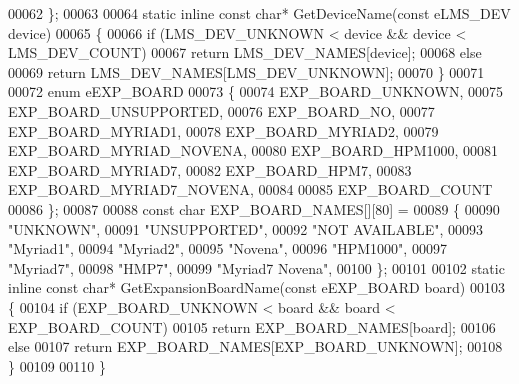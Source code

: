 \begin{DoxyCode}
00062 \};
00063 
00064 \textcolor{keyword}{static} \textcolor{keyword}{inline} \textcolor{keyword}{const} \textcolor{keywordtype}{char}* GetDeviceName(\textcolor{keyword}{const} eLMS_DEV device)
00065 \{
00066     \textcolor{keywordflow}{if} (LMS_DEV_UNKNOWN < device && device < LMS_DEV_COUNT)
00067         \textcolor{keywordflow}{return} LMS\_DEV\_NAMES[device];
00068     \textcolor{keywordflow}{else}
00069         \textcolor{keywordflow}{return} LMS\_DEV\_NAMES[LMS_DEV_UNKNOWN];
00070 \}
00071 
00072 \textcolor{keyword}{enum} eEXP_BOARD
00073 \{
00074     EXP_BOARD_UNKNOWN,
00075     EXP_BOARD_UNSUPPORTED,
00076     EXP_BOARD_NO,
00077     EXP_BOARD_MYRIAD1,
00078     EXP_BOARD_MYRIAD2,
00079     EXP_BOARD_MYRIAD_NOVENA,
00080     EXP_BOARD_HPM1000,
00081     EXP_BOARD_MYRIAD7,
00082     EXP_BOARD_HPM7,
00083     EXP_BOARD_MYRIAD7_NOVENA,
00084 
00085     EXP_BOARD_COUNT
00086 \};
00087 
00088 \textcolor{keyword}{const} \textcolor{keywordtype}{char} EXP_BOARD_NAMES[][80] =
00089 \{
00090     \textcolor{stringliteral}{"UNKNOWN"},
00091     \textcolor{stringliteral}{"UNSUPPORTED"},
00092     \textcolor{stringliteral}{"NOT AVAILABLE"},
00093     \textcolor{stringliteral}{"Myriad1"},
00094     \textcolor{stringliteral}{"Myriad2"},
00095     \textcolor{stringliteral}{"Novena"},
00096     \textcolor{stringliteral}{"HPM1000"},
00097     \textcolor{stringliteral}{"Myriad7"},
00098     \textcolor{stringliteral}{"HMP7"},
00099     \textcolor{stringliteral}{"Myriad7 Novena"},
00100 \};
00101 
00102 \textcolor{keyword}{static} \textcolor{keyword}{inline} \textcolor{keyword}{const} \textcolor{keywordtype}{char}* GetExpansionBoardName(\textcolor{keyword}{const} eEXP_BOARD board)
00103 \{
00104     \textcolor{keywordflow}{if} (EXP_BOARD_UNKNOWN < board && board < EXP_BOARD_COUNT)
00105         \textcolor{keywordflow}{return} EXP\_BOARD\_NAMES[board];
00106     \textcolor{keywordflow}{else}
00107         \textcolor{keywordflow}{return} EXP\_BOARD\_NAMES[EXP_BOARD_UNKNOWN];
00108 \}
00109 
00110 \}
\end{DoxyCode}
